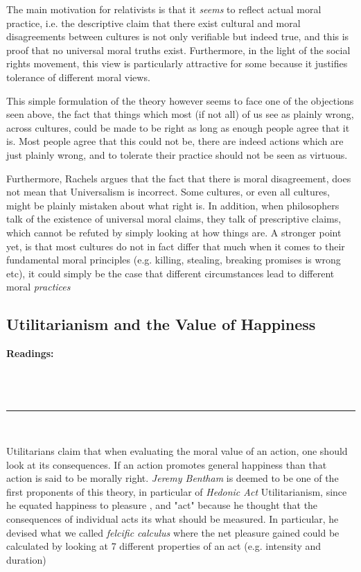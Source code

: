 \documentclass[english,course]{Notes}
\newcommand{\ita}[1]{\textit{#1}}
\newcommand\readings{\textbf{Readings:} \\}
\newcommand\sep{\\ \noindent\rule{10cm}{0.8pt} \\}
\begin{document}
{{\par{The main motivation for relativists is that it \ita{seems} to reflect actual moral practice, i.e. the descriptive claim that there exist cultural and moral disagreements between cultures is not only verifiable but indeed true, and this is proof that no universal moral truths exist. Furthermore, in the light of the social rights movement, this view is particularly attractive for some because it justifies tolerance of different moral views.}
\par{This simple formulation of the theory however seems to face one of the objections seen above, the fact that things which most (if not all) of us see as plainly wrong, across cultures, could be made to be right as long as enough people agree that it is. Most people agree that this could not be, there are indeed actions which are just plainly wrong, and to tolerate their practice should not be seen as virtuous.} 
\par{Furthermore, Rachels argues that the fact that there is moral disagreement, does not mean that Universalism is incorrect. Some cultures, or even all cultures, might be plainly mistaken about what right is. In addition, when philosophers talk of the existence of universal moral claims, they talk of prescriptive claims, which cannot be refuted by simply looking at how things are. A stronger point yet, is that most cultures do not in fact differ that much when it comes to their fundamental moral principles (e.g. killing, stealing, breaking promises is wrong etc), it could simply be the case that different circumstances lead to different moral \ita{practices}}




\newpage
\subsection{Utilitarianism and the Value of Happiness}
\readings \cite[Chapter 3]{driver_2014} \\ \cite[Chapter 12]{darwall_1998} \\ \cite{mccord}
\sep


\par{Utilitarians claim that when evaluating the moral value of an action, one should look at its consequences. If an action promotes general happiness than that action is said to be morally right. \ita{Jeremy Bentham} is deemed to be one of the first proponents of this theory, in particular of \ita{Hedonic Act} Utilitarianism, since he equated happiness to pleasure , and "act" because he thought that the consequences of individual acts its what should be measured. In particular, he devised what we called \ita{felcific calculus} where the net pleasure gained could be calculated by looking at 7 different properties of an act (e.g. intensity and duration)}

}}
\end{document}
